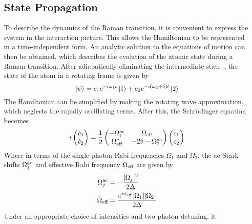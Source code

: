 \subsection{State Propagation}
To describe the dynamics of the Raman transition, it is convenient to
express the system in the interaction picture. This allows the
Hamiltonian to be represented in a time-independent form. An analytic
solution to the equations of motion can then be obtained, which
describes the evolution of the atomic state during a Raman transition. After adiabatically
eliminating the intermediate state~\cite{Weiss1994}, the state of the
atom in a rotating frame is given by
\begin{equation}
  \label{eq:state_raman}
  \ket{\psi} = c_1 e^{-i \omega_1 t}\ket{1} + c_2 e^{-i (\omega_2 +
  \delta) t} \ket{2}
\end{equation}
The Hamiltonian can be simplified by making the rotating wave
approximation, which neglects the rapidly oscillating terms. After
this, the Schr\"odinger equation becomes
\begin{equation}
  \label{eq:raman_eom}
  i \begin{pmatrix} \dot{c}_1 \\ \dot{c}_2 \end{pmatrix} =
  \frac{1}{2} \begin{pmatrix}
    -\Omega_1^\textnormal{ac} & \Omega_\textnormal{eff} \\
    \Omega_\textnormal{eff}^*&  -2 \delta - \Omega_2^\textnormal{ac}  \\
    \end{pmatrix} \begin{pmatrix} c_1 \\ c_2\end{pmatrix}
\end{equation}
Where in terms of the single-photon Rabi frequencies $\Omega_1$ and
$\Omega_2$, the ac Stark shifts $\Omega_j^\textnormal{ac}$ and
effective Rabi frequency $\Omega_\textnormal{eff}$ are given by 
\begin{subequations}
\begin{align}
  \Omega_j^\textnormal{ac} &= -\frac{|\Omega_j|^2}{2 \Delta
  }\label{eq:raman_ac_stark}\\
  \Omega_\textnormal{eff}&=\frac{e^{i\phi_\textnormal{eff}} |\Omega_1|
    |\Omega_2|}{2 \Delta }\label{eq:raman_rabi} 
\end{align}
\end{subequations}
Under an appropriate choice of intensities and two-photon detuning, it
